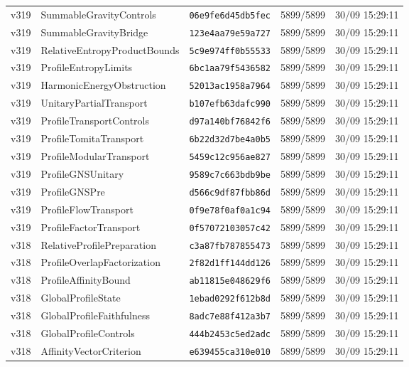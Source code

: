 \documentclass[11pt]{article}
\theoremstyle{definition}\newtheorem{deriv}{Derivation}
\begin{document}
{\begin{longtable}{@{}lllll@{}}
v319 & SummableGravityControls & \texttt{06e9fe6d45db5fec} & 5899/5899 & 30/09 15:29:11 \\
v319 & SummableGravityBridge & \texttt{123e4aa79e59a727} & 5899/5899 & 30/09 15:29:11 \\
v319 & RelativeEntropyProductBounds & \texttt{5c9e974ff0b55533} & 5899/5899 & 30/09 15:29:11 \\
v319 & ProfileEntropyLimits & \texttt{6bc1aa79f5436582} & 5899/5899 & 30/09 15:29:11 \\
v319 & HarmonicEnergyObstruction & \texttt{52013ac1958a7964} & 5899/5899 & 30/09 15:29:11 \\
v319 & UnitaryPartialTransport & \texttt{b107efb63dafc990} & 5899/5899 & 30/09 15:29:11 \\
v319 & ProfileTransportControls & \texttt{d97a140bf76842f6} & 5899/5899 & 30/09 15:29:11 \\
v319 & ProfileTomitaTransport & \texttt{6b22d32d7be4a0b5} & 5899/5899 & 30/09 15:29:11 \\
v319 & ProfileModularTransport & \texttt{5459c12c956ae827} & 5899/5899 & 30/09 15:29:11 \\
v319 & ProfileGNSUnitary & \texttt{9589c7c663bdb9be} & 5899/5899 & 30/09 15:29:11 \\
v319 & ProfileGNSPre & \texttt{d566c9df87fbb86d} & 5899/5899 & 30/09 15:29:11 \\
v319 & ProfileFlowTransport & \texttt{0f9e78f0af0a1c94} & 5899/5899 & 30/09 15:29:11 \\
v319 & ProfileFactorTransport & \texttt{0f57072103057c42} & 5899/5899 & 30/09 15:29:11 \\
v318 & RelativeProfilePreparation & \texttt{c3a87fb787855473} & 5899/5899 & 30/09 15:29:11 \\
v318 & ProfileOverlapFactorization & \texttt{2f82d1ff144dd126} & 5899/5899 & 30/09 15:29:11 \\
v318 & ProfileAffinityBound & \texttt{ab11815e048629f6} & 5899/5899 & 30/09 15:29:11 \\
v318 & GlobalProfileState & \texttt{1ebad0292f612b8d} & 5899/5899 & 30/09 15:29:11 \\
v318 & GlobalProfileFaithfulness & \texttt{8adc7e88f412a3b7} & 5899/5899 & 30/09 15:29:11 \\
v318 & GlobalProfileControls & \texttt{444b2453c5ed2adc} & 5899/5899 & 30/09 15:29:11 \\
v318 & AffinityVectorCriterion & \texttt{e639455ca310e010} & 5899/5899 & 30/09 15:29:11 \\

\end{longtable}}
\end{document}
